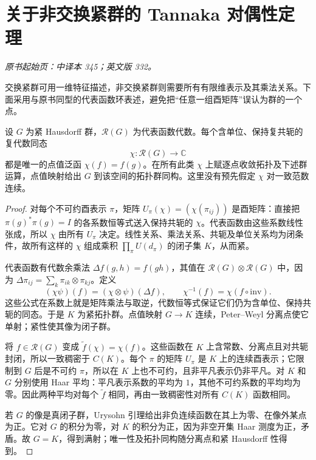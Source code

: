 \section{关于非交换紧群的 Tannaka 对偶性定理}\label{sec:yosida-11-11}
\noindent\textit{原书起始页：中译本 345；英文版 332。}

交换紧群可用一维特征描述，非交换紧群则需要所有有限维表示及其乘法关系。下面采用与原书同型的代表函数环表述，避免把“任意一组酉矩阵”误认为群的一个点。

\begin{theorem}\label{thm:y11-tannaka}
设 $G$ 为紧 Hausdorff 群，$\mathcal R(G)$ 为代表函数代数。每个含单位、保持复共轭的复代数同态
\[
 \chi:\mathcal R(G)\longrightarrow\mathbb C
\]
都是唯一的点值泛函 $\chi(f)=f(g)$。在所有此类 $\chi$ 上赋逐点收敛拓扑及下述群运算，点值映射给出 $G$ 到该空间的拓扑群同构。这里没有预先假定 $\chi$ 对一致范数连续。
\end{theorem}
\begin{proof}
对每个不可约酉表示 $\pi$，矩阵 $U_\pi(\chi)=(\chi(\pi_{ij}))$ 是酉矩阵：直接把 $\pi(g)^*\pi(g)=I$ 的各系数恒等式送入保持共轭的 $\chi$。代表函数由这些系数线性张成，所以 $\chi$ 由所有 $U_\pi$ 决定。线性关系、乘法关系、共轭及单位关系均为闭条件，故所有这样的 $\chi$ 组成乘积 $\prod_\pi U(d_\pi)$ 的闭子集 $K$，从而紧。

代表函数有代数余乘法 $\Delta f(g,h)=f(gh)$，其值在 $\mathcal R(G)\otimes\mathcal R(G)$ 中，因为 $\Delta\pi_{ij}=\sum_k\pi_{ik}\otimes\pi_{kj}$。定义
\[
 (\chi\psi)(f)=(\chi\otimes\psi)(\Delta f),\qquad
 \chi^{-1}(f)=\chi(f\circ\mathrm{inv}).
\]
这些公式在系数上就是矩阵乘法与取逆，代数恒等式保证它们仍为含单位、保持共轭的同态。于是 $K$ 为紧拓扑群。点值映射 $G\to K$ 连续，Peter--Weyl 分离点使它单射；紧性使其像为闭子群。

将 $f\in\mathcal R(G)$ 变成 $\widetilde f(\chi)=\chi(f)$。这些函数在 $K$ 上含常数、分离点且对共轭封闭，所以一致稠密于 $C(K)$。每个 $\pi$ 的矩阵 $U_\pi$ 是 $K$ 上的连续酉表示；它限制到 $G$ 后是不可约 $\pi$，所以在 $K$ 上也不可约，且非平凡表示仍非平凡。对 $K$ 和 $G$ 分别使用 Haar 平均：平凡表示系数的平均为 $1$，其他不可约系数的平均均为零。因此两种平均对每个 $\widetilde f$ 相同，再由一致稠密性对所有 $C(K)$ 函数相同。

若 $G$ 的像是真闭子群，Urysohn 引理给出非负连续函数在其上为零、在像外某点为正。它对 $G$ 的积分为零，对 $K$ 的积分为正，因为非空开集 Haar 测度为正，矛盾。故 $G=K$，得到满射；唯一性及拓扑同构随分离点和紧 Hausdorff 性得到。
\end{proof}

